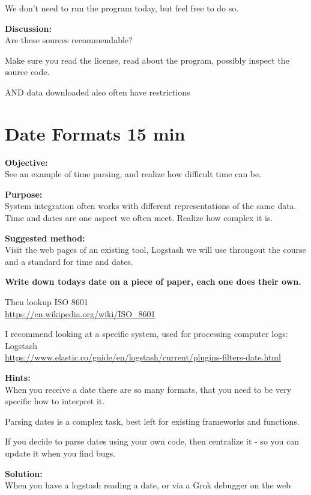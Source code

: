 \documentclass[a4paper,11pt,notitlepage]{report}
\begin{document}
We don't need to run the program today, but feel free to do so.

{\bf Discussion:}\\
Are these sources recommendable?

Make sure you read the license, read about the program, possibly inspect the source code.

AND data downloaded also often have restrictions


\chapter{Date Formats 15 min}
\label{ex:dateformats}


{\bf Objective:}\\
See an example of time parsing, and realize how difficult time can be.

{\bf Purpose:}\\
System integration often works with different representations of the same data. Time and dates are one aspect we often meet. Realize how complex it is.

{\bf Suggested method:}\\
Visit the web pages of an existing tool, Logstash we will use througout the course and a standard for time and dates.

{\bf Write down todays date on a piece of paper, each one does their own.}

Then lookup ISO 8601\\
\url{https://en.wikipedia.org/wiki/ISO_8601}

I recommend looking at a specific system, used for processing computer logs:
Logstash \\
\url{https://www.elastic.co/guide/en/logstash/current/plugins-filters-date.html}


{\bf Hints:}\\
When you receive a date there are so many formats, that you need to be very specific how to interpret it.

Parsing dates is a complex task, best left for existing frameworks and functions.

If you decide to parse dates using your own code, then centralize it - so you can update it when you find bugs.

{\bf Solution:}\\
When you have a logstash reading a date, or via a Grok debugger on the web
\end{document}
